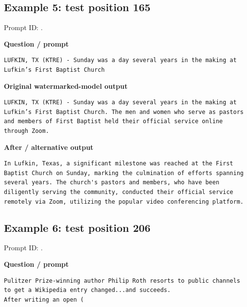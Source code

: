 \subsection{Example 5: test position
165}\label{record-docs-watermarking-qualitative-paper-sir-vanilla-md-example-5-test-position-165}

Prompt ID:
\texttt{}.

\textbf{Question / prompt}

\begin{Verbatim}
LUFKIN, TX (KTRE) - Sunday was a day several years in the making at Lufkin’s First Baptist Church
\end{Verbatim}

\textbf{Original watermarked-model output}

\begin{Verbatim}
LUFKIN, TX (KTRE) - Sunday was a day several years in the making at Lufkin’s First Baptist Church. The men and women who serve as pastors and members of First Baptist held their official service online through Zoom.
\end{Verbatim}

\textbf{After / alternative output}

\begin{Verbatim}
In Lufkin, Texas, a significant milestone was reached at the First Baptist Church on Sunday, marking the culmination of efforts spanning several years. The church's pastors and members, who have been diligently serving the community, conducted their official service remotely via Zoom, utilizing the popular video conferencing platform.
\end{Verbatim}

\subsection{Example 6: test position
206}\label{record-docs-watermarking-qualitative-paper-sir-vanilla-md-example-6-test-position-206}

Prompt ID:
\texttt{}.

\textbf{Question / prompt}

\begin{Verbatim}
Pulitzer Prize-winning author Philip Roth resorts to public channels to get a Wikipedia entry changed...and succeeds.
After writing an open (
\end{Verbatim}

